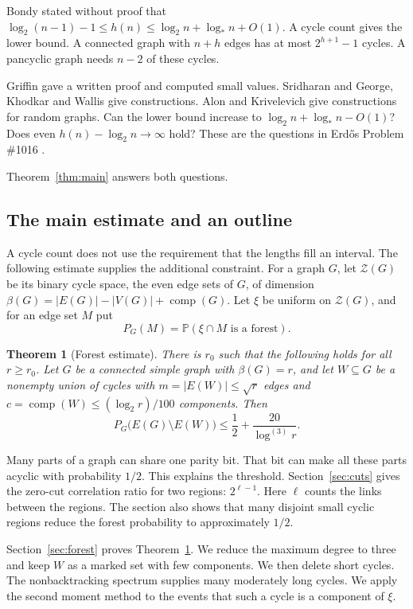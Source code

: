 \documentclass[11pt,a4paper]{article}
\numberwithin{equation}{section}
\newtheorem{theorem}{Theorem}[section]
\theoremstyle{definition}
\theoremstyle{remark}
\newcommand{\cZ}{\mathcal Z}
\newcommand{\Prob}{\mathbb P}
\newcommand{\cc}{\operatorname{comp}}
\newcommand{\lstar}{\log_*}
\begin{document}
Bondy \cite{Bondy} stated without proof that $\log_2(n-1)-1\le h(n)\le\log_2n+\lstar n+O(1)$. A cycle count gives the lower bound. A connected graph with $n+h$ edges has at most $2^{h+1}-1$ cycles. A pancyclic graph needs $n-2$ of these cycles.

Griffin \cite{Griffin} gave a written proof and computed small values. Sridharan \cite{Sridharan} and George, Khodkar and Wallis \cite{GKW} give constructions. Alon and Krivelevich \cite{AK} give constructions for random graphs. Can the lower bound increase to $\log_2n+\lstar n-O(1)$? Does even $h(n)-\log_2n\to\infty$ hold? These are the questions in Erd\H{o}s Problem \#1016 \cite{ErdosProblems}.

Theorem~\ref{thm:main} answers both questions.

\subsection{The main estimate and an outline}\label{sec:outline}
A cycle count does not use the requirement that the lengths fill an interval. The following estimate supplies the additional constraint. For a graph $G$, let $\cZ(G)$ be its binary cycle space, the even edge sets of $G$, of dimension $\beta(G)=|E(G)|-|V(G)|+\cc(G)$. Let $\xi$ be uniform on $\cZ(G)$, and for an edge set $M$ put
\[
 P_G(M)=\Prob(\xi\cap M\text{ is a forest}).
\]

\begin{theorem}[Forest estimate]\label{thm:forest}
There is $r_0$ such that the following holds for all $r\ge r_0$. Let $G$ be a connected simple graph with $\beta(G)=r$, and let $W\subseteq G$ be a nonempty union of cycles with $m=|E(W)|\le\sqrt r$ edges and $c=\cc(W)\le(\log_2r)/100$ components. Then
\begin{equation}\label{eq:forest-main}
 P_G\bigl(E(G)\setminus E(W)\bigr)\le\frac12+\frac{20}{\log^{(3)}r}.
\end{equation}
\end{theorem}

Many parts of a graph can share one parity bit. That bit can make all these parts acyclic with probability $1/2$. This explains the threshold. Section~\ref{sec:cuts} gives the zero-cut correlation ratio for two regions: $2^{\ell-1}$. Here $\ell$ counts the links between the regions. The section also shows that many disjoint small cyclic regions reduce the forest probability to approximately $1/2$.

Section~\ref{sec:forest} proves Theorem~\ref{thm:forest}. We reduce the maximum degree to three and keep $W$ as a marked set with few components. We then delete short cycles. The nonbacktracking spectrum supplies many moderately long cycles. We apply the second moment method to the events that such a cycle is a component of $\xi$.
\end{document}
